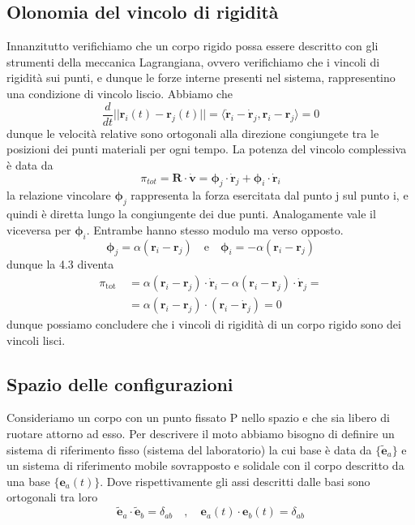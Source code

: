 \subsection{Olonomia del vincolo di rigidit\`{a}}
Innanzitutto verifichiamo che un corpo rigido possa essere descritto con gli strumenti della meccanica Lagrangiana, ovvero verifichiamo che i vincoli di rigidit\`{a} sui punti, e dunque le forze interne presenti nel sistema, rappresentino una condizione di vincolo liscio.
\newline
Abbiamo che 
\begin{equation}
	\frac{d}{dt}||\bm{r}_i(t) - \bm{r}_j(t)||= \langle \dot{\bm{r}}_i - \bm{\dot{r}}_j,\bm{r}_i - \bm{r}_j\rangle  = 0
\end{equation}
dunque le velocit\`{a} relative sono ortogonali  alla direzione congiungete tra le posizioni dei punti materiali per ogni tempo. La potenza del vincolo complessiva \`{e} data da 
\begin{equation}
	\pi_{tot} = \bm{R} \cdot \bm{\dot{v}} = \bm{\phi}_j \cdot  \bm{\dot{r}}_j + \bm{\phi}_i \cdot \bm{\dot{r}}_i
\end{equation}
la relazione vincolare $\bm{{\phi}}_j$ rappresenta la forza esercitata dal punto j sul punto i, e quindi \`{e} diretta lungo la congiungente dei due punti. Analogamente vale il viceversa per $\bm{\phi}_i$. Entrambe hanno stesso modulo ma verso opposto.
\begin{equation}
	\bm{\phi}_j = \alpha(\bm{r}_i - \bm{r}_j) \quad \text{e} \quad \bm{\phi}_i = - \alpha(\bm{r}_i - \bm{r}_j)
\end{equation}
dunque la 4.3 diventa 
\begin{equation}
\begin{aligned}
\pi_{\text {tot }} & =\alpha\left(\bm{r}_i-\bm{r}_j\right) \cdot \dot{\bm{r}}_i-\alpha\left(\bm{r}_i - \bm{r}_j\right) \cdot \dot{\bm{r}}_j= \\
& =\alpha\left(\bm{r}_i-\bm{r}_j\right) \cdot\left(\bm{r}_i-\dot{\bm{r}}_j\right)=0
\end{aligned}
\end{equation}
dunque possiamo concludere che i vincoli di rigidit\`{a} di un corpo rigido sono dei vincoli lisci.

\subsection{Spazio delle configurazioni}
Consideriamo un corpo con un punto fissato P nello spazio e che sia libero di ruotare attorno ad esso. Per descrivere il moto abbiamo bisogno di definire un sistema di riferimento fisso (sistema del laboratorio) la cui base \`{e} data da $\{\bm{\tilde{e}}_a \}$ e un sistema di riferimento mobile sovrapposto e solidale con il corpo descritto da una base $\{\bm{e}_a(t)\}$. Dove rispettivamente gli assi descritti dalle basi sono ortogonali tra loro 
\begin{equation}
\tilde{\mathbf{e}}_a \cdot \tilde{\mathbf{e}}_b=\delta_{a b} \quad, \quad \mathbf{e}_a(t) \cdot \mathbf{e}_b(t)=\delta_{a b}
\end{equation}

